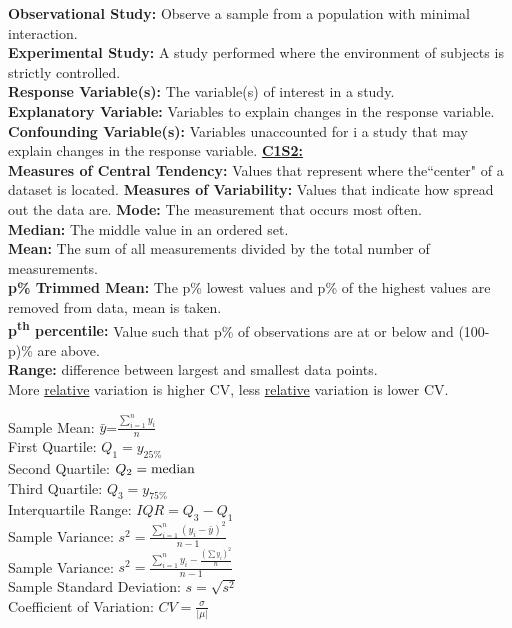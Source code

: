 \documentclass[letter, 12pt]{article}
\begin{document}
\begin{multicols}{2}
\textbf{Observational Study:} Observe a sample from a population with minimal interaction.\\
\textbf{Experimental Study:} A study performed where the environment of subjects is strictly controlled.\\
\textbf{Response Variable(s):} The variable(s) of interest in a study.\\
\textbf{Explanatory Variable:} Variables to explain changes in the response variable.\\
\textbf{Confounding Variable(s):} Variables unaccounted for i a study that may explain changes in the response variable.
\textbf{\uline{C1S2:}}\\
\textbf{Measures of Central Tendency:} Values that represent where the``center" of a dataset is located.
\textbf{Measures of Variability:} Values that indicate how spread out the data are.
\textbf{Mode:} The measurement that occurs most often.\\
\textbf{Median:} The middle value in an ordered set.\\
\textbf{Mean:} The sum of all measurements divided by the total number of measurements.\\
\textbf{p\% Trimmed Mean:} The p\% lowest values and p\% of the highest values are removed from data, mean is taken.\\
\textbf{p\textsuperscript{th} percentile:} Value such that p\% of observations are at or below and (100-p)\% are above.\\
\textbf{Range:} difference between largest and smallest data points.\\
More \uline{relative} variation is higher CV, less \uline{relative} variation is lower CV.\\

\end{multicols}
\newpage
\begin{multicols}{2}
Sample Mean: $\bar{y}$=$\frac{\sum_{i=1}^n y_i}{n}$\\
First Quartile: $Q_1=y_{25\%}$\\
Second Quartile: $Q_2=\textnormal{median}$\\
Third Quartile: $Q_3=y_{75\%}$\\
Interquartile Range: $IQR=Q_3-Q_1$\\
Sample Variance: $s^2=\frac{\sum_{i=1}^n (y_i-\bar{y})^2}{n-1}$\\
Sample Variance: $s^2=\frac{\sum_{i=1}^n y_i - \frac{(\sum y_i)^2}{n}}{n-1}$\\
Sample Standard Deviation: $s=\sqrt{s^2}$\\
Coefficient of Variation: $CV=\frac{\sigma}{\lvert\mu\rvert}$
\vfill
\columnbreak
\vspace*{\fill}
\end{multicols}
\end{document}
